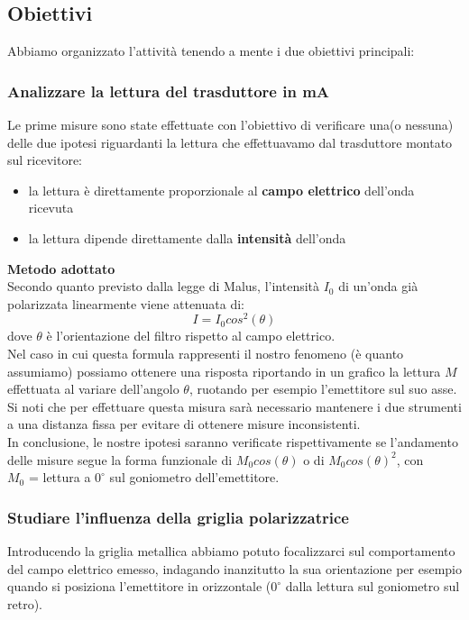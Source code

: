 \documentclass{article}
\theoremstyle{definition}
\begin{document}
\subsection{Obiettivi}
Abbiamo organizzato l'attività tenendo a mente i due obiettivi principali:
\subsubsection{Analizzare la lettura del trasduttore in mA}

Le prime misure sono state effettuate con l'obiettivo di verificare una(o nessuna) delle due ipotesi riguardanti la lettura che effettuavamo dal trasduttore montato sul ricevitore:
\begin{itemize}
  \item  la lettura è direttamente proporzionale al \textbf{campo elettrico} dell'onda ricevuta
  \item la lettura dipende direttamente dalla \textbf{intensità} dell'onda
\end{itemize}

\noindent \textbf{Metodo adottato}\\

\noindent Secondo quanto previsto dalla legge di Malus, l'intensità \(I_{0}\) di un'onda già polarizzata linearmente viene attenuata di:
\[I = I_{0} cos^{2}(\theta)\]
dove \(\theta\) è l'orientazione del filtro  rispetto al campo elettrico.\\
\noindent Nel caso in cui questa formula rappresenti il nostro fenomeno (è quanto assumiamo) possiamo ottenere una risposta riportando in un grafico la lettura \(M\) effettuata al variare dell'angolo \(\theta\), ruotando per esempio l'emettitore sul suo asse. Si noti che per effettuare questa misura sarà necessario mantenere i due strumenti a una distanza fissa per evitare di ottenere misure inconsistenti.\\
\noindent In conclusione, le nostre ipotesi saranno verificate rispettivamente se l'andamento delle misure segue la forma funzionale di \(M_{0}cos(\theta)\) o di \(M_{0}cos(\theta)^{2}\), con\\ \(M_{0}\) = lettura a \( 0^{\circ} \) sul goniometro dell'emettitore.

\subsubsection{Studiare l'influenza della griglia polarizzatrice}
Introducendo la griglia metallica abbiamo potuto focalizzarci sul comportamento del campo elettrico emesso, indagando inanzitutto la sua orientazione per esempio quando si posiziona l'emettitore in orizzontale (\(0^{\circ}\) dalla lettura sul goniometro sul retro).\\
\end{document}
